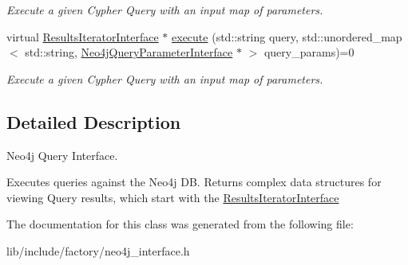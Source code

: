 \begin{DoxyCompactItemize}
\begin{DoxyCompactList}\small\item\em Execute a given Cypher Query with an input map of parameters. \end{DoxyCompactList}\item 
\hypertarget{classNeo4jInterface_ad4abc507257157f08a562d1d1c76d7ce}{virtual \hyperlink{classResultsIteratorInterface}{Results\-Iterator\-Interface} $\ast$ \hyperlink{classNeo4jInterface_ad4abc507257157f08a562d1d1c76d7ce}{execute} (std\-::string query, std\-::unordered\-\_\-map$<$ std\-::string, \hyperlink{classNeo4jQueryParameterInterface}{Neo4j\-Query\-Parameter\-Interface} $\ast$ $>$ query\-\_\-params)=0}\label{classNeo4jInterface_ad4abc507257157f08a562d1d1c76d7ce}

\begin{DoxyCompactList}\small\item\em Execute a given Cypher Query with an input map of parameters. \end{DoxyCompactList}\end{DoxyCompactItemize}


\subsection{Detailed Description}
Neo4j Query Interface. 

Executes queries against the Neo4j D\-B. Returns complex data structures for viewing Query results, which start with the \hyperlink{classResultsIteratorInterface}{Results\-Iterator\-Interface} 

The documentation for this class was generated from the following file\-:\begin{DoxyCompactItemize}
\item 
lib/include/factory/neo4j\-\_\-interface.\-h\end{DoxyCompactItemize}
